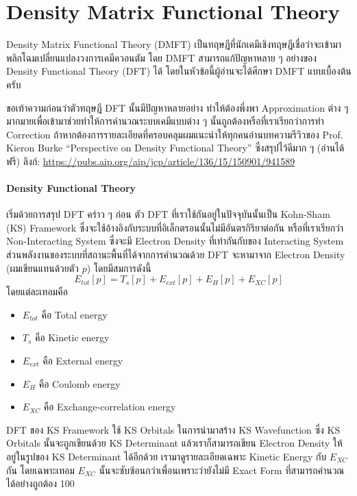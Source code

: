 \section{Density Matrix Functional Theory}

Density Matrix Functional Theory (DMFT) เป็นทฤษฎีที่นักเคมีเชิงทฤษฎีเชื่อว่าจะเข้ามาพลิกโฉมเปลี่ยนแปลงวงการเคมีควอนตัม โดย DMFT สามารถแก้ปัญหาหลาย ๆ อย่างของ Density Functional Theory (DFT) ได้ โดยในหัวข้อนี้ผู้อ่านจะได้ศึกษา DMFT แบบเบื้องต้นครับ

ขอเท้าความก่อนว่าตัวทฤษฎี DFT นั้นมีปัญหาหลายอย่าง ทำให้ต้องพึ่งพา Approximation ต่าง ๆ มากมายเพื่อเข้ามาช่วยทำให้การคำนวณระบบเคมีแบบต่าง ๆ นั้นถูกต้องหรือที่เราเรียกว่าการทำ Correction ถ้าหากต้องการรายละเอียดที่ครอบคลุมผมแนะนำให้ทุกคนอ่านบทความรีวิวของ Prof. Kieron Burke \enquote{Perspective on Density Functional Theory} ซึ่งสรุปไว้ดีมาก ๆ (อ่านได้ฟรี) ลิงก์: \url{https://pubs.aip.org/aip/jcp/article/136/15/150901/941589}

\paragraph{Density Functional Theory}

เริ่มด้วยการสรุป DFT คร่าว ๆ ก่อน ตัว DFT ที่เราใช้กันอยู่ในปัจจุบันนั้นเป็น Kohn-Sham (KS) Framework ซึ่งจะใช้อ้างอิงกับระบบที่อิเล็กตรอนนั้นไม่มีอันตรกิริยาต่อกัน หรือที่เราเรียกว่า Non-Interacting System ซึ่งจะมี Electron Density ที่เท่ากันกับของ Interacting System ส่วนพลังงานของระบบที่สถานะพื้นที่ได้จากการคำนวณด้วย DFT จะหามาจาก Electron Density (ผมเขียนแทนด้วยตัว $p$) โดยมีสมการดังนี้
%
\begin{equation}
  E_{tot}[p] 
  = 
  T_{s}[p] + E_{ext}[p] + E_{H}[p] + E_{XC}[p]
\end{equation}
%
\noindent โดยแต่ละเทอมคือ
%
\begin{itemize}[topsep=0pt,noitemsep]
  \setlength\itemsep{0.5em}
  \item $E_{tot}$ คือ Total energy
  \item $T_{s}$ คือ Kinetic energy
  \item $E_{ext}$ คือ External energy
  \item $E_{H}$ คือ Coulomb energy
  \item $E_{XC}$ คือ Exchange-correlation energy
\end{itemize}

DFT ของ KS Framework ใช้ KS Orbitals ในการนำมาสร้าง KS Wavefunction ซึ่ง KS Orbitals นั้นจะถูกเขียนด้วย KS Determinant แล้วเราก็สามารถเขียน Electron Density ให้อยู่ในรูปของ KS Determinant ได้อีกด้วย เรามาดูรายละเอียดเฉพาะ Kinetic Energy กับ $E_{XC}$ กัน โดยเฉพาะเทอม $E_{XC}$ นั้นจะซับซ้อนกว่าเพื่อนเพราะว่ายังไม่มี Exact Form ที่สามารถคำนวณได้อย่างถูกต้อง 100

